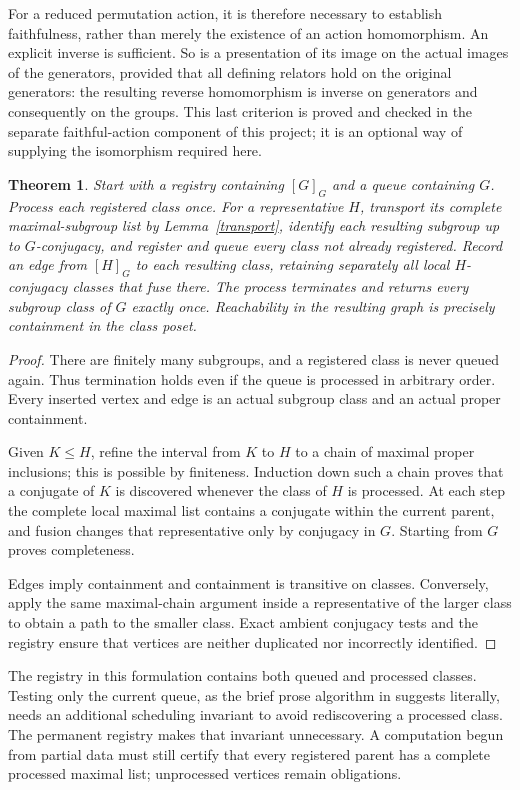 \documentclass[11pt]{article}
\newtheorem{theorem}{Theorem}\newtheorem{lemma}[theorem]{Lemma}
\begin{document}
For a reduced permutation action, it is therefore necessary to establish
faithfulness, rather than merely the existence of an action homomorphism.
An explicit inverse is sufficient. So is a presentation of its image on
the actual images of the generators, provided that all defining relators
hold on the original generators: the resulting reverse homomorphism is
inverse on generators and consequently on the groups. This last criterion
is proved and checked in the separate faithful-action component of this
project; it is an optional way of supplying the isomorphism required here.

\begin{theorem}\label{descent}
Start with a registry containing $[G]_G$ and a queue containing $G$.
Process each registered class once. For a representative $H$, transport
its complete maximal-subgroup list by Lemma~\ref{transport}, identify each
resulting subgroup up to $G$-conjugacy, and register and queue every class
not already registered. Record an edge from $[H]_G$ to each resulting
class, retaining separately all local $H$-conjugacy classes that fuse there.
The process terminates and returns every subgroup class of $G$ exactly
once. Reachability in the resulting graph is precisely containment in
the class poset.
\end{theorem}
\begin{proof}
There are finitely many subgroups, and a registered class is never queued
again. Thus termination holds even if the queue is processed in arbitrary
order. Every inserted vertex and edge is an actual subgroup class and an
actual proper containment.

Given $K\leq H$, refine the interval from $K$ to $H$ to a chain of maximal
proper inclusions; this is possible by finiteness. Induction down such a
chain proves that a conjugate of $K$ is discovered whenever the class of
$H$ is processed. At each step the complete local maximal list contains a
conjugate within the current parent, and fusion changes that representative
only by conjugacy in $G$. Starting from $G$ proves completeness.

Edges imply containment and containment is transitive on classes.
Conversely, apply the same maximal-chain argument inside a representative
of the larger class to obtain a path to the smaller class. Exact ambient
conjugacy tests and the registry ensure that vertices are neither duplicated
nor incorrectly identified.
\end{proof}

The registry in this formulation contains both queued and processed
classes. Testing only the current queue, as the brief prose algorithm in
\cite{CL} suggests literally, needs an additional scheduling invariant to
avoid rediscovering a processed class. The permanent registry makes that
invariant unnecessary. A computation begun from partial data must still
certify that every registered parent has a complete processed maximal list;
unprocessed vertices remain obligations.
\end{document}
